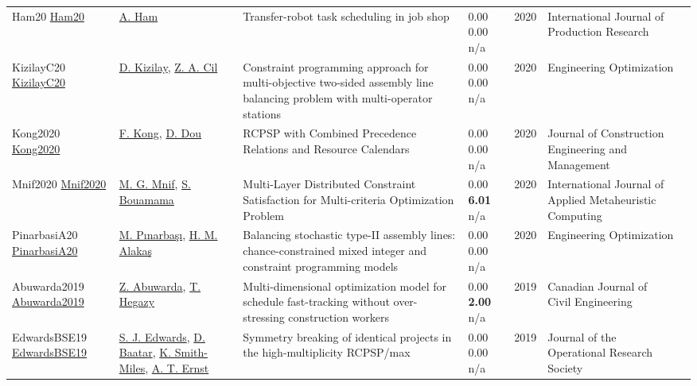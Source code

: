 {\begin{longtable}{p{3cm}p{5cm}p{10cm}p{1cm}rp{2.5cm}l}
Ham20 \href{http://dx.doi.org/10.1080/00207543.2019.1709671}{Ham20} & \hyperref[auth:a749]{A. Ham} & Transfer-robot task scheduling in job shop & \noindent{}\textcolor{black!50}{0.00} \textcolor{black!50}{0.00} n/a & 2020 & \cellcolor{red!20}International Journal of Production Research & \cite{Ham20}\\
KizilayC20 \href{http://dx.doi.org/10.1080/0305215x.2020.1786081}{KizilayC20} & \hyperref[auth:a1379]{D. Kizilay}, \hyperref[auth:a1380]{Z. A. Cil} & Constraint programming approach for multi-objective two-sided assembly line balancing problem with multi-operator stations & \noindent{}\textcolor{black!50}{0.00} \textcolor{black!50}{0.00} n/a & 2020 & \cellcolor{red!20}Engineering Optimization & \cite{KizilayC20}\\
Kong2020 \href{http://dx.doi.org/10.1061/(asce)co.1943-7862.0001929}{Kong2020} & \hyperref[auth:a1704]{F. Kong}, \hyperref[auth:a1777]{D. Dou} & RCPSP with Combined Precedence Relations and Resource Calendars & \noindent{}\textcolor{black!50}{0.00} \textcolor{black!50}{0.00} n/a & 2020 & Journal of Construction Engineering and Management & \cite{Kong2020}\\
Mnif2020 \href{http://dx.doi.org/10.4018/ijamc.2020040107}{Mnif2020} & \hyperref[auth:a1961]{M. G. Mnif}, \hyperref[auth:a1962]{S. Bouamama} & Multi-Layer Distributed Constraint Satisfaction for Multi-criteria Optimization Problem & \noindent{}\textcolor{black!50}{0.00} \textbf{6.01} n/a & 2020 & International Journal of Applied Metaheuristic Computing & \cite{Mnif2020}\\
PinarbasiA20 \href{http://dx.doi.org/10.1080/0305215x.2020.1716746}{PinarbasiA20} & \hyperref[auth:a1383]{M. Pınarbaşı}, \hyperref[auth:a763]{H. M. Alakaş} & Balancing stochastic type-II assembly lines: chance-constrained mixed integer and constraint programming models & \noindent{}\textcolor{black!50}{0.00} \textcolor{black!50}{0.00} n/a & 2020 & \cellcolor{red!20}Engineering Optimization & \cite{PinarbasiA20}\\
Abuwarda2019 \href{http://dx.doi.org/10.1139/cjce-2018-0544}{Abuwarda2019} & \hyperref[auth:a1518]{Z. Abuwarda}, \hyperref[auth:a1519]{T. Hegazy} & \cellcolor{gold!20}Multi-dimensional optimization model for schedule fast-tracking without over-stressing construction workers & \noindent{}\textcolor{black!50}{0.00} \textbf{2.00} n/a & 2019 & Canadian Journal of Civil Engineering & \cite{Abuwarda2019}\\
EdwardsBSE19 \href{http://dx.doi.org/10.1080/01605682.2019.1595192}{EdwardsBSE19} & \hyperref[auth:a891]{S. J. Edwards}, \hyperref[auth:a892]{D. Baatar}, \hyperref[auth:a893]{K. Smith-Miles}, \hyperref[auth:a468]{A. T. Ernst} & Symmetry breaking of identical projects in the high-multiplicity RCPSP/max & \noindent{}\textcolor{black!50}{0.00} \textcolor{black!50}{0.00} n/a & 2019 & \cellcolor{red!20}Journal of the Operational Research Society & \cite{EdwardsBSE19}\\

\end{longtable}}
